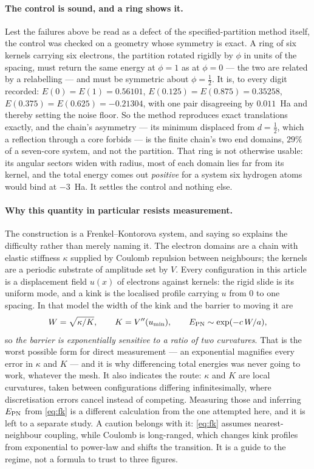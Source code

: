 \documentclass[11pt]{article}
\begin{document}
\paragraph{The control is sound, and a ring shows it.} Lest the failures above be read as a defect
of the specified-partition method itself, the control was checked on a geometry whose symmetry is
exact. A ring of six kernels carrying six electrons, the partition rotated rigidly by $\phi$ in
units of the spacing, must return the same energy at $\phi=1$ as at $\phi=0$ --- the two are related
by a relabelling --- and must be symmetric about $\phi=\tfrac12$. It is, to every digit recorded:
$E(0)=E(1)=0.56101$, $E(0.125)=E(0.875)=0.35258$, $E(0.375)=E(0.625)=-0.21304$, with one pair
disagreeing by $0.011$~Ha and thereby setting the noise floor. So the method reproduces exact
translations exactly, and the chain's asymmetry --- its minimum displaced from $d=\tfrac12$, which a
reflection through a core forbids --- is the finite chain's two end domains, $29\%$ of a seven-core
system, and not the partition. That ring is not otherwise usable: its angular sectors widen with
radius, most of each domain lies far from its kernel, and the total energy comes out
\emph{positive} for a system six hydrogen atoms would bind at $-3$~Ha. It settles the control and
nothing else.

\paragraph{Why this quantity in particular resists measurement.} The construction is a
Frenkel--Kontorova system, and saying so explains the difficulty rather than merely naming it. The
electron domains are a chain with elastic stiffness $\kappa$ supplied by Coulomb repulsion between
neighbours; the kernels are a periodic substrate of amplitude set by $V$. Every configuration in
this article is a displacement field $u(x)$ of electrons against kernels: the rigid slide is its
uniform mode, and a kink is the localised profile carrying $u$ from $0$ to one spacing. In that
model the width of the kink and the barrier to moving it are
\begin{equation}\label{eq:fk}
W=\sqrt{\kappa/K},\qquad K=V''(u_{\min}),\qquad E_{\rm PN}\sim\exp(-c\,W/a),
\end{equation}
so \emph{the barrier is exponentially sensitive to a ratio of two curvatures}. That is the worst
possible form for direct measurement --- an exponential magnifies every error in $\kappa$ and $K$ ---
and it is why differencing total energies was never going to work, whatever the mesh. It also
indicates the route: $\kappa$ and $K$ are local curvatures, taken between configurations differing
infinitesimally, where discretisation errors cancel instead of competing. Measuring those and
inferring $E_{\rm PN}$ from \eqref{eq:fk} is a different calculation from the one attempted here,
and it is left to a separate study. A caution belongs with it: \eqref{eq:fk} assumes
nearest-neighbour coupling, while Coulomb is long-ranged, which changes kink profiles from
exponential to power-law and shifts the transition. It is a guide to the regime, not a formula to
trust to three figures.
\end{document}
